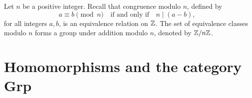 
\begin{definition}
    \label{def:zmodn}
    Let \(n\) be a positive integer. Recall that congruence modulo \(n\),
    defined by
    \[
        a \equiv b \pmod{n} \quad \text{if and only if} \quad n \mid (a - b),
    \]
    for all integers \(a, b\), is an equivalence relation on \(\mathbb{Z}\). The set of
    equivalence classes modulo \(n\) forms a group under addition modulo \(n\),
    denoted by \(\mathbb{Z}/n\mathbb{Z}\).
\end{definition}

\section{Homomorphisms and the category {\normalfont\sffamily Grp}}


